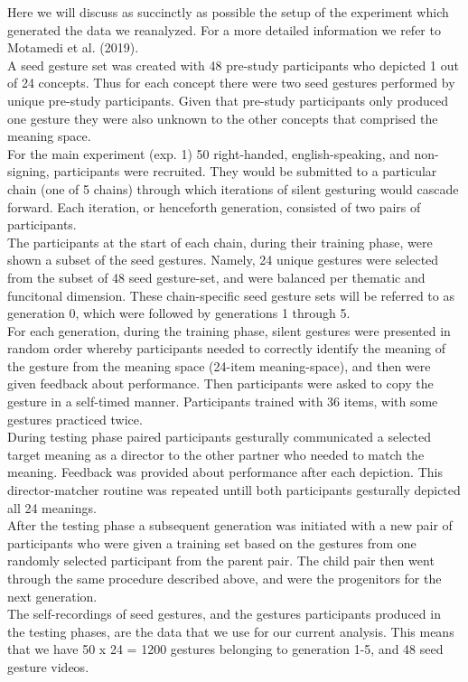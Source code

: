 \documentclass[
  man, noextraspace,floatsintext]{apa6}
\begin{document}
Here we will discuss as succinctly as possible the setup of the experiment which generated the data we reanalyzed. For a more detailed information we refer to Motamedi et al. (2019).\\
A seed gesture set was created with 48 pre-study participants who depicted 1 out of 24 concepts. Thus for each concept there were two seed gestures performed by unique pre-study participants. Given that pre-study participants only produced one gesture they were also unknown to the other concepts that comprised the meaning space.\\
For the main experiment (exp. 1) 50 right-handed, english-speaking, and non-signing, participants were recruited. They would be submitted to a particular chain (one of 5 chains) through which iterations of silent gesturing would cascade forward. Each iteration, or henceforth generation, consisted of two pairs of participants.\\
The participants at the start of each chain, during their training phase, were shown a subset of the seed gestures. Namely, 24 unique gestures were selected from the subset of 48 seed gesture-set, and were balanced per thematic and funcitonal dimension. These chain-specific seed gesture sets will be referred to as generation 0, which were followed by generations 1 through 5.\\
For each generation, during the training phase, silent gestures were presented in random order whereby participants needed to correctly identify the meaning of the gesture from the meaning space (24-item meaning-space), and then were given feedback about performance. Then participants were asked to copy the gesture in a self-timed manner. Participants trained with 36 items, with some gestures practiced twice.\\
During testing phase paired participants gesturally communicated a selected target meaning as a director to the other partner who needed to match the meaning. Feedback was provided about performance after each depiction. This director-matcher routine was repeated untill both participants gesturally depicted all 24 meanings.\\
After the testing phase a subsequent generation was initiated with a new pair of participants who were given a training set based on the gestures from one randomly selected participant from the parent pair. The child pair then went through the same procedure described above, and were the progenitors for the next generation.\\
The self-recordings of seed gestures, and the gestures participants produced in the testing phases, are the data that we use for our current analysis. This means that we have 50 x 24 = 1200 gestures belonging to generation 1-5, and 48 seed gesture videos.
\end{document}
